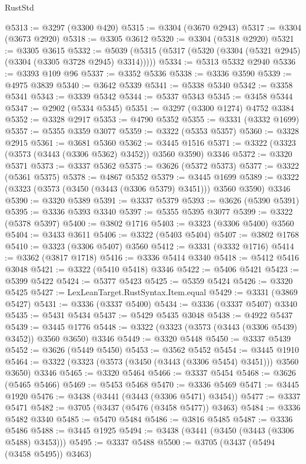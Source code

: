 \begin{lexlean}{RustStd}
\begin{coremodule}
@5313 := @3297 (@3300 @420)
@5315 := @3304 (@3670 @2943)
@5317 := @3304 (@3673 @2920)
@5318 := @3305 @3612
@5320 := @3304 (@5318 @2920)
@5321 := @3305 @3615
@5332 := @5039 (@5315 (@5317 (@5320 (@3304 (@5321 @2945) (@3304 (@3305 @3728 @2945) @3314)))))
@5334 := @5313 @5332 @2940
@5336 := @3393 @109 @96
@5337 := @3352 @5336
@5338 := @3336 @3590
@5339 := @4975 @3839
@5340 := @3642 @5339
@5341 := @5338 @5340
@5342 := @3358 @5341
@5343 := @3339 @5342
@5344 := @5337 @5343
@5345 := @3458 @5344
@5347 := @2902 (@5334 @5345)
@5351 := @3297 (@3300 @1274) @4752 @3384
@5352 := @3328 @2917
@5353 := @4790 @5352
@5355 := @3331 (@3332 @1699)
@5357 := @5355 @3359 @3077
@5359 := @3322 (@5353 @5357)
@5360 := @3328 @2915
@5361 := @3681 @5360
@5362 := @3445 @1516
@5371 := @3322 (@3323 (@3573 (@3443 (@3306 @5362) @3452)) @3560 @3590) @3346
@5372 := @3320 @5371
@5373 := @3337 @5362
@5375 := @3626 (@5372 @5373)
@5377 := @3322 (@5361 @5375)
@5378 := @4867 @5352
@5379 := @3445 @1699
@5389 := @3322 (@3323 (@3573 (@3450 (@3443 (@3306 @5379) @3451))) @3560 @3590) @3346
@5390 := @3320 @5389
@5391 := @3337 @5379
@5393 := @3626 (@5390 @5391)
@5395 := @3336 @5393 @3340
@5397 := @5355 @5395 @3077
@5399 := @3322 (@5378 @5397)
@5400 := @3802 @1716
@5403 := @3323 (@3306 @5400) @3560
@5404 := @3433 @3611
@5406 := @3322 (@5403 @5404)
@5407 := @3802 @1768
@5410 := @3323 (@3306 @5407) @3560
@5412 := @3331 (@3332 @1716)
@5414 := @3362 (@3817 @1718)
@5416 := @3336 @5414 @3340
@5418 := @5412 @5416 @3048
@5421 := @3322 (@5410 @5418) @3346
@5422 := @5406 @5421
@5423 := @5399 @5422
@5424 := @5377 @5423
@5425 := @5359 @5424
@5426 := @3320 @5425
@5427 := LexLeanTarget.RustSyntax.Item.equal
@5429 := @3331 (@3869 @5427)
@5431 := @3336 (@3337 @5400)
@5434 := @3336 (@3337 @5407) @3340
@5435 := @5431 @5434
@5437 := @5429 @5435 @3048
@5438 := @4922 @5437
@5439 := @3445 @1776
@5448 := @3322 (@3323 (@3573 (@3443 (@3306 @5439) @3452)) @3560 @3650) @3346
@5449 := @3320 @5448
@5450 := @3337 @5439
@5452 := @3626 (@5449 @5450)
@5453 := @3562 @5452
@5454 := @3445 @1910
@5464 := @3322 (@3323 (@3573 (@3450 (@3443 (@3306 @5454) @3451))) @3560 @3650) @3346
@5465 := @3320 @5464
@5466 := @3337 @5454
@5468 := @3626 (@5465 @5466)
@5469 := @5453 @5468
@5470 := @3336 @5469
@5471 := @3445 @1920
@5476 := @3438 (@3441 (@3443 (@3306 @5471) @3454))
@5477 := @3337 @5471
@5482 := @3705 (@3437 (@5476 (@3458 @5477)) @3463)
@5484 := @3336 @5482 @3340
@5485 := @5470 @5484
@5486 := @3816 @5485
@5487 := @3336 @5486
@5488 := @3445 @1925
@5494 := @3438 (@3441 (@3450 (@3443 (@3306 @5488) @3453)))
@5495 := @3337 @5488
@5500 := @3705 (@3437 (@5494 (@3458 @5495)) @3463)

\end{coremodule}
\end{lexlean}
